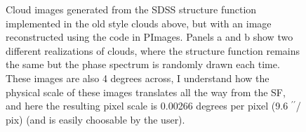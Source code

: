 \documentclass[11pt,preprint]{aastex}
\def\arcsec{$^{\prime\prime}$}
\begin{document}
\begin{figure}[htpb]
\centering
{}
\caption{{\small
Cloud images generated from the SDSS structure function implemented in the old style clouds above, but with an image reconstructed using the code in PImages. Panels a and b show two different realizations of clouds, where the structure function remains the same but the phase spectrum is randomly drawn each time. These images are also 4 degrees across, I understand how the physical scale of these images translates all the way from the SF, and here the resulting pixel scale is 0.00266 degrees per pixel (9.6 \arcsec / pix) (and is easily choosable by the user).}}
\label{fig:clouds_newimages}
\end{figure} 
\end{document}
